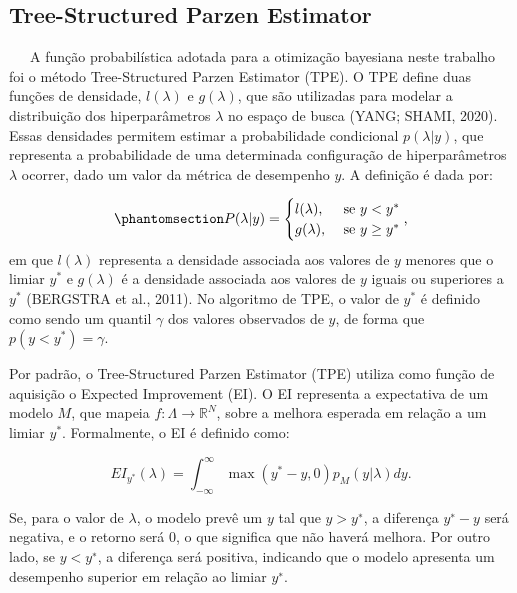 \documentclass[
  12pt,
  a4paper,
]{scrreprt}
\begin{document}
\subsection{Tree-Structured Parzen
Estimator}\label{tree-structured-parzen-estimator}

~~~A função probabilística adotada para a otimização bayesiana neste
trabalho foi o método Tree-Structured Parzen Estimator (TPE). O TPE
define duas funções de densidade, \(l\left(\lambda\right)\) e
\(g\left(\lambda\right)\), que são utilizadas para modelar a
distribuição dos hiperparâmetros \(\lambda\) no espaço de busca (YANG;
SHAMI, 2020). Essas densidades permitem estimar a probabilidade
condicional \(p\left(\lambda | y\right)\), que representa a
probabilidade de uma determinada configuração de hiperparâmetros
\(\lambda\) ocorrer, dado um valor da métrica de desempenho \(y\). A
definição é dada por:

\begin{equation}\phantomsection\label{eq-tpe}{
P(\lambda|y) =
\begin{cases}
    l(\lambda)\text{, } & \text{se } y < y^* \\
    g(\lambda)\text{, } & \text{se } y \ge y^*
\end{cases}\text{,}
}\end{equation} em que \(l\left(\lambda\right)\) representa a densidade
associada aos valores de \(y\) menores que o limiar \(y^*\) e
\(g\left(\lambda\right)\) é a densidade associada aos valores de \(y\)
iguais ou superiores a \(y^*\) (BERGSTRA et al., 2011). No algoritmo de
TPE, o valor de \(y^*\) é definido como sendo um quantil \(\gamma\) dos
valores observados de \(y\), de forma que
\(p\left(y < y^*\right) = \gamma\).

\vspace{12pt}

Por padrão, o Tree-Structured Parzen Estimator (TPE) utiliza como função
de aquisição o Expected Improvement (EI). O EI representa a expectativa
de um modelo \(M\), que mapeia \(f:\Lambda \rightarrow \mathbb{R}^N\),
sobre a melhora esperada em relação a um limiar \(y^*\). Formalmente, o
EI é definido como:

\[
EI_{y^*}\left(\lambda\right) = \int_{-\infty}^{\infty} \max\left(y^* - y, 0\right)p_{M}\left(y|\lambda\right)dy\text{.}
\]

Se, para o valor de \(\lambda\), o modelo prevê um \(y\) tal que
\(y > y^∗\), a diferença \(y^∗ − y\) será negativa, e o retorno será 0,
o que significa que não haverá melhora. Por outro lado, se \(y < y^∗\),
a diferença será positiva, indicando que o modelo apresenta um
desempenho superior em relação ao limiar \(y^∗\).
\end{document}
